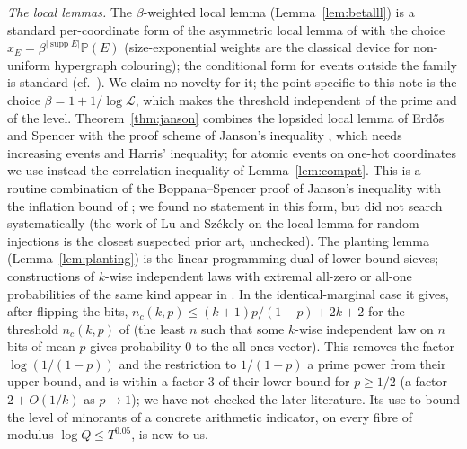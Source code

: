 \documentclass[11pt,reqno]{amsart}
\theoremstyle{definition}
\newcommand{\Lc}{\mathcal L}
\newcommand{\PP}{\mathbb P}
\newcommand{\supp}{\operatorname{supp}}
\begin{document}
\emph{The local lemmas.}  The $\beta$-weighted local lemma
(Lemma~\ref{lem:betalll}) is a standard per-coordinate form of the asymmetric
local lemma of \cite[Lemma~5.1.1]{AS} with the choice
$x_E=\beta^{|\supp E|}\PP(E)$ (size-exponential weights are the classical device for
non-uniform hypergraph colouring); the conditional form for events outside
the family is standard (cf.\ \cite{HSS}).  We claim no novelty for it; the
point specific to this note is the choice $\beta=1+1/\log\Lc$, which makes the
threshold independent of the prime and of the level.  Theorem~\ref{thm:janson} combines the lopsided local lemma of
Erd\H{o}s and Spencer \cite{ErdosSpencer} with the proof scheme of Janson's
inequality \cite{Janson}, which needs increasing events and Harris'
inequality; for atomic events on one-hot coordinates we use instead the
correlation inequality of Lemma~\ref{lem:compat}.  This is a routine
combination of the Boppana--Spencer proof of Janson's inequality with the
inflation bound of \cite{HSS}; we found no statement in this form, but did
not search systematically (the work of Lu and Sz\'ekely on the local lemma
for random injections is the closest suspected prior art, unchecked).  The
planting lemma (Lemma~\ref{lem:planting}) is the linear-programming dual of
lower-bound sieves; constructions of $k$-wise independent laws with
extremal all-zero or all-one probabilities of the same kind appear in
\cite{BGP,PYY}.  In the identical-marginal case it gives, after flipping the
bits, $n_c(k,p)\le(k+1)p/(1-p)+2k+2$ for the threshold $n_c(k,p)$ of
\cite[Thm.~27]{BGP} (the least $n$ such that some $k$-wise independent law on
$n$ bits of mean $p$ gives probability $0$ to the all-ones vector).  This removes the factor
$\log(1/(1-p))$ and the restriction to $1/(1-p)$ a prime power from their upper
bound, and is within a factor $3$ of their lower bound for $p\ge1/2$ (a factor
$2+O(1/k)$ as $p\to1$);
we have not checked the later literature.  Its use to bound the level of minorants of
a concrete arithmetic indicator, on every fibre of modulus
$\log Q\le T^{0.05}$, is new to us.
\end{document}
